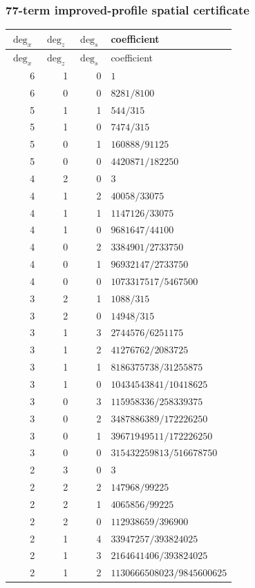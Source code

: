 \subsubsection*{77-term improved-profile spatial certificate}
\begin{longtable}{rrrl}
$\deg_{x}$ & $\deg_{z}$ & $\deg_{s}$ & coefficient\\
\toprule
\endfirsthead
$\deg_{x}$ & $\deg_{z}$ & $\deg_{s}$ & coefficient\\
\toprule
\endhead
6 & 1 & 0 & $1$\\
6 & 0 & 0 & $8281/8100$\\
5 & 1 & 1 & $544/315$\\
5 & 1 & 0 & $7474/315$\\
5 & 0 & 1 & $160888/91125$\\
5 & 0 & 0 & $4420871/182250$\\
4 & 2 & 0 & $3$\\
4 & 1 & 2 & $40058/33075$\\
4 & 1 & 1 & $1147126/33075$\\
4 & 1 & 0 & $9681647/44100$\\
4 & 0 & 2 & $3384901/2733750$\\
4 & 0 & 1 & $96932147/2733750$\\
4 & 0 & 0 & $1073317517/5467500$\\
3 & 2 & 1 & $1088/315$\\
3 & 2 & 0 & $14948/315$\\
3 & 1 & 3 & $2744576/6251175$\\
3 & 1 & 2 & $41276762/2083725$\\
3 & 1 & 1 & $8186375738/31255875$\\
3 & 1 & 0 & $10434543841/10418625$\\
3 & 0 & 3 & $115958336/258339375$\\
3 & 0 & 2 & $3487886389/172226250$\\
3 & 0 & 1 & $39671949511/172226250$\\
3 & 0 & 0 & $315432259813/516678750$\\
2 & 3 & 0 & $3$\\
2 & 2 & 2 & $147968/99225$\\
2 & 2 & 1 & $4065856/99225$\\
2 & 2 & 0 & $112938659/396900$\\
2 & 1 & 4 & $33947257/393824025$\\
2 & 1 & 3 & $2164641406/393824025$\\
2 & 1 & 2 & $1130666508023/9845600625$\\

\end{longtable}
